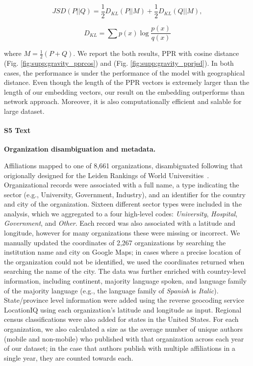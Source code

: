 \documentclass[12pt]{article} %
\begin{document}
\begin{equation}
	\label{eq:JSD}
	JSD(P||Q) = \frac{1}{2}D_{KL}(P||M) + \frac{1}{2}D_{KL}(Q||M),
\end{equation}

\begin{equation}
	\label{eq:KL}
	D_{KL} = \sum p(x)\log\frac{p(x)}{q(x)}
\end{equation}

where $M=\frac{1}{2}(P+Q)$. We report the both results, PPR with cosine distance (Fig. \ref{fig:supp:gravity_pprcos}) and (Fig. \ref{fig:supp:gravity_pprjsd}). In both cases, the performance is under the performance of the model with geographical distance. Even though the length of the PPR vectors is extremely larger than the length of our embedding vectors, our result on the embedding outperforms than network approach. Moreover, it is also computationally efficient and salable for large dataset.


%
\paragraph*{S5 Text}
\label{si:text:organizations}
{\bf Organization disambiguation and metadata.}

Affiliations mapped to one of 8,661 organizations, disambiguated following that origionally designed for the Leiden Rankings of World Universities~\autocite{waltman2012leidenrankings}.
Organizational records were associated with a full name, a type indicating the sector (e.g., University, Government, Industry), and an identifier for the country and city of the organization.
Sixteen different sector types were included in the analysis, which we aggregated to a four high-level codes: \textit{University}, \textit{Hospital}, \textit{Government}, and \textit{Other}.
Each record was also associated with a latitude and longitude, however for many organizations these were missing or incorrect. We manually updated the coordinates of 2,267 organizations by searching the institution name and city on Google Maps;
in cases where a precise location of the organization could not be identified, we used the coordinates returned when searching the name of the city.
The data was further enriched with country-level information, including continent, majority language spoken, and language family of the majority language (e.g., the language family of \textit{Spanish} is \textit{Italic}).
State/province level  information were added using the reverse geocoding service LocationIQ using each organization's latitude and longitude as input.
Regional census classifications were also added for states in the United States.
For each organization, we also calculated a size as the average number of unique authors (mobile and non-mobile) who published with that organization across each year of our dataset;
in the case that authors publish with multiple affiliations in a single year, they are counted towards each.
\end{document}
